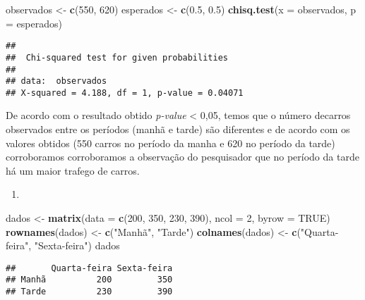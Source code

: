 \documentclass[14pt,titlepage, oneside, openany, a4paper]{book}
\newenvironment{Shaded}{\begin{snugshade}}{\end{snugshade}}
\newcommand{\DataTypeTok}[1]{\textcolor[rgb]{0.13,0.29,0.53}{#1}}
\newcommand{\DecValTok}[1]{\textcolor[rgb]{0.00,0.00,0.81}{#1}}
\newcommand{\FloatTok}[1]{\textcolor[rgb]{0.00,0.00,0.81}{#1}}
\newcommand{\KeywordTok}[1]{\textcolor[rgb]{0.13,0.29,0.53}{\textbf{#1}}}
\newcommand{\NormalTok}[1]{#1}
\newcommand{\OtherTok}[1]{\textcolor[rgb]{0.56,0.35,0.01}{#1}}
\newcommand{\StringTok}[1]{\textcolor[rgb]{0.31,0.60,0.02}{#1}}
\begin{document}
\begin{Shaded}
\begin{Highlighting}[]
\NormalTok{observados <-}\StringTok{ }\KeywordTok{c}\NormalTok{(}\DecValTok{550}\NormalTok{, }\DecValTok{620}\NormalTok{)}
\NormalTok{esperados <-}\StringTok{ }\KeywordTok{c}\NormalTok{(}\FloatTok{0.5}\NormalTok{, }\FloatTok{0.5}\NormalTok{)}
\KeywordTok{chisq.test}\NormalTok{(}\DataTypeTok{x =}\NormalTok{ observados, }\DataTypeTok{p =}\NormalTok{ esperados)}
\end{Highlighting}
\end{Shaded}

\begin{verbatim}
## 
##  Chi-squared test for given probabilities
## 
## data:  observados
## X-squared = 4.188, df = 1, p-value = 0.04071
\end{verbatim}

De acordo com o resultado obtido \emph{p-value} \textless{} 0,05, temos que o número decarros observados entre os períodos (manhã e tarde) são diferentes e de acordo com os valores obtidos (550 carros no período da manha e 620 no período da tarde) corroboramos corroboramos a observação do pesquisador que no período da tarde há um maior trafego de carros.

\begin{enumerate}
\def\labelenumi{\arabic{enumi})}
\setcounter{enumi}{1}
\item
\end{enumerate}

\begin{Shaded}
\begin{Highlighting}[]
\NormalTok{dados <-}\StringTok{ }\KeywordTok{matrix}\NormalTok{(}\DataTypeTok{data =} \KeywordTok{c}\NormalTok{(}\DecValTok{200}\NormalTok{, }\DecValTok{350}\NormalTok{, }\DecValTok{230}\NormalTok{, }\DecValTok{390}\NormalTok{), }\DataTypeTok{ncol =} \DecValTok{2}\NormalTok{, }\DataTypeTok{byrow =} \OtherTok{TRUE}\NormalTok{)}
\KeywordTok{rownames}\NormalTok{(dados) <-}\StringTok{ }\KeywordTok{c}\NormalTok{(}\StringTok{"Manhã"}\NormalTok{, }\StringTok{"Tarde"}\NormalTok{)}
\KeywordTok{colnames}\NormalTok{(dados) <-}\StringTok{ }\KeywordTok{c}\NormalTok{(}\StringTok{"Quarta-feira"}\NormalTok{, }\StringTok{"Sexta-feira"}\NormalTok{)}
\NormalTok{dados}
\end{Highlighting}
\end{Shaded}

\begin{verbatim}
##       Quarta-feira Sexta-feira
## Manhã          200         350
## Tarde          230         390
\end{verbatim}
\end{document}
